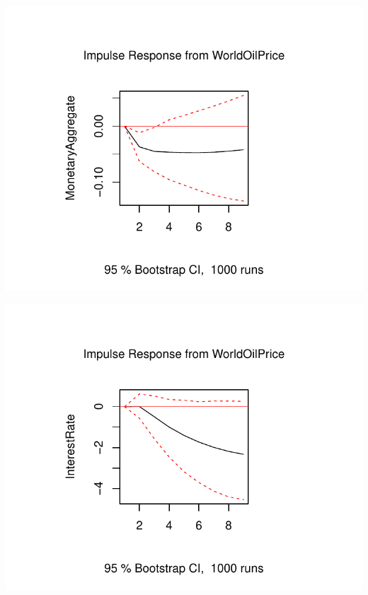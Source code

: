 \documentclass[11pt,preprint, authoryear]{elsarticle}
\numberwithin{equation}{section}
\numberwithin{figure}{section}
\numberwithin{table}{section}
\begin{document}
\begin{center}\includegraphics{README_files/figure-latex/unnamed-chunk-8-1} \end{center}

\begin{center}\includegraphics{README_files/figure-latex/unnamed-chunk-8-2} \end{center}
\end{document}

